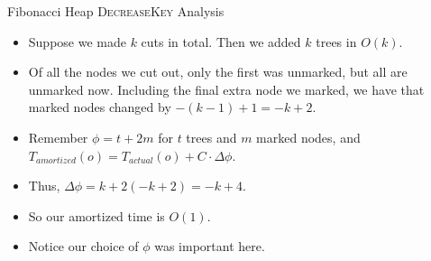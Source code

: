 \documentclass[aspectratio=169]{beamer}
\begin{document}
\begin{frame}{Fibonacci Heap \textsc{DecreaseKey} Analysis}
    \begin{itemize}
        \item Suppose we made $k$ cuts in total. Then we added $k$ trees in \textcolor{sigma@mainblue}{$O(k)$}.\pause
        \item Of all the nodes we cut out, only the first was unmarked, but all are unmarked now. Including the final extra node we marked, we have that marked nodes changed by $-(k - 1) + 1 = -k + 2$.\pause
        \item Remember $\phi = t + 2m$ for $t$ trees and $m$ marked nodes, and $T_{\textit{amortized}}(o) = T_{\textit{actual}}(o) + C \cdot \Delta \phi$.\pause
        \item Thus, $\Delta \phi = k + 2(-k + 2) = -k + 4$.\pause
        \item So our amortized time is \textcolor{sigma@mainblue}{$O(1)$}.\pause
        \item Notice our choice of $\phi$ was important here.
    \end{itemize}
\end{frame}
\end{document}
